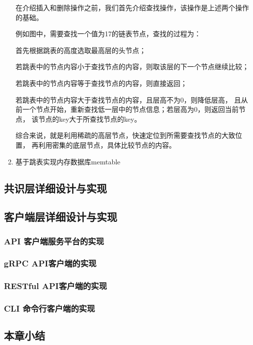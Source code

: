 \begin{enumerate}
		在介绍插入和删除操作之前，我们首先介绍查找操作，该操作是上述两个操作的基础。

例如图中，需要查找一个值为17的链表节点，查找的过程为：

首先根据跳表的高度选取最高层的头节点；

若跳表中的节点内容小于查找节点的内容，则取该层的下一个节点继续比较；

若跳表中的节点内容等于查找节点的内容，则直接返回；

若跳表中的节点内容大于查找节点的内容，且层高不为0，则降低层高，
且从前一个节点开始，重新查找低一层中的节点信息；若层高为0，则返回当前节点，
该节点的key大于所查找节点的key。

综合来说，就是利用稀疏的高层节点，快速定位到所需要查找节点的大致位置，
再利用密集的底层节点，具体比较节点的内容。
		
		\item 基于跳表实现内存数据库memtable
	\end{enumerate}
  	\subsection{共识层详细设计与实现}


        

  \subsection{客户端层详细设计与实现}
  	
		\subsubsection{API 客户端服务平台的实现}
		
		
		\subsubsection{gRPC API客户端的实现}
		
		
	 	\subsubsection{RESTful API客户端的实现}
	 	
	 	
		\subsubsection{CLI 命令行客户端的实现}
		


	\subsection{本章小结}
 \clearpage